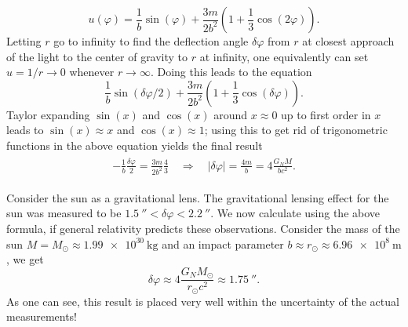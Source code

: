\documentclass[a4paper,11pt]{article}
\numberwithin{equation}{section}
\begin{document}
{\begin{equation}
u(\varphi) = \frac{1}{b}\sin(\varphi) + \frac{3m}{2b^2}\left(1 + \frac{1}{3}\cos(2\varphi)\right).
\end{equation} Letting $r$ go to infinity to find the deflection angle $\delta \varphi$ from $r$ at closest approach of the light to the center of gravity to $r$ at infinity, one equivalently can set $u = 1/r \rightarrow 0$ whenever $r\rightarrow \infty$. Doing this leads to the equation \begin{equation}
\frac{1}{b}\sin(\delta \varphi/2) + \frac{3m}{2b^2}\left(1 + \frac{1}{3}\cos(\delta \varphi)\right). 
\end{equation} Taylor expanding $\sin(x)$ and $\cos(x)$ around $x \approx 0$ up to first order in $x$ leads to $\sin(x) \approx x$ and $\cos(x) \approx 1$; using this to get rid of trigonometric functions in the above equation yields the final result \begin{align}
\begin{aligned}
-\frac{1}{b}\frac{\delta \varphi}{2} = \frac{3m}{2b^2}\frac{4}{3} \quad \Rightarrow \quad |\delta \varphi| = \frac{4m}{b} = 4\frac{G_NM}{bc^2}.
\end{aligned}
\end{align}

Consider the sun as a gravitational lens. The gravitational lensing effect for the sun was measured to be $\SI{1.5}{\arcsecond} < \delta \varphi < \SI{2.2}{\arcsecond}$. We now calculate using the above formula, if general relativity predicts these observations. Consider the mass of the sun $M = M_\odot \approx \SI{1.99e30}{\kilogram}$ and an impact parameter $b \approx r_\odot \approx  \SI{6.96e8}{\meter}$, we get \begin{equation}
\delta \varphi \approx 4\frac{G_N M_\odot}{r_\odot c^2} \approx \SI{1.75}{\arcsecond}.
\end{equation} As one can see, this result is placed very well within the uncertainty of the actual measurements!

}

\end{document}
